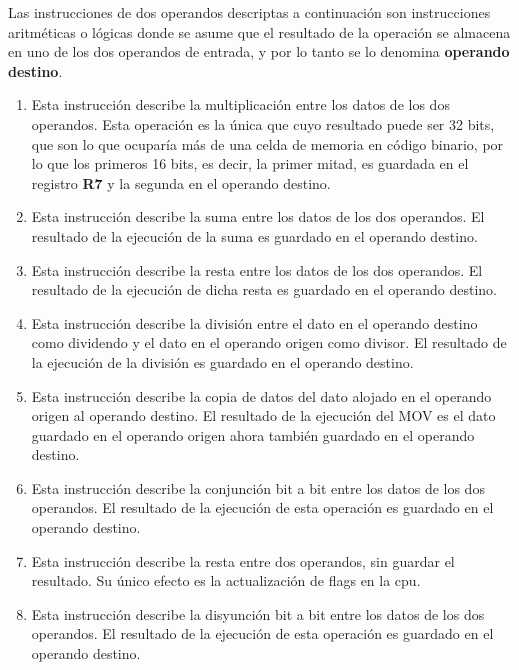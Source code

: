 

Las instrucciones de dos operandos descriptas a continuación son instrucciones aritméticas o lógicas donde se asume que el resultado de la operación se almacena en uno de los dos operandos de entrada, y por lo tanto se lo denomina \textbf{operando destino}.

\begin{enumerate}
\item  {}
Esta instrucción describe la multiplicación entre los datos de los dos operandos. Esta operación es la única que cuyo resultado puede ser 32 bits, que son lo que ocuparía más de una celda de memoria en código binario, por lo que los primeros 16 bits, es decir, la primer mitad, es guardada en el registro \textbf{R7} y la segunda en el operando destino.
 
\item  {}
Esta instrucción describe la suma entre los datos de los dos operandos. El resultado de la ejecución de la suma es guardado en el operando destino.

\item  {}
Esta instrucción describe la resta entre los datos de los dos operandos. El resultado de la ejecución de dicha resta es guardado en el operando destino.

\item  {}
Esta instrucción describe la división entre el dato en el operando destino como dividendo y el dato en el operando origen como divisor. El resultado de la ejecución de la división es guardado en el operando destino.

\item  {}
Esta instrucción describe la copia de datos del dato alojado en el operando origen al operando destino. El resultado de la ejecución del MOV es el dato guardado en el operando origen ahora también guardado en el operando destino.

\item  {}
Esta instrucción describe la conjunción bit a bit entre los datos de los dos operandos. El resultado de la ejecución de esta operación es guardado en el operando destino.

\item  {}
Esta instrucción describe la resta entre dos operandos, sin guardar el resultado. Su único efecto es la actualización de flags en la cpu.

\item  {}
Esta instrucción describe la disyunción bit a bit entre los datos de los dos operandos. El resultado de la ejecución de esta operación es guardado en el operando destino.
\end{enumerate}

